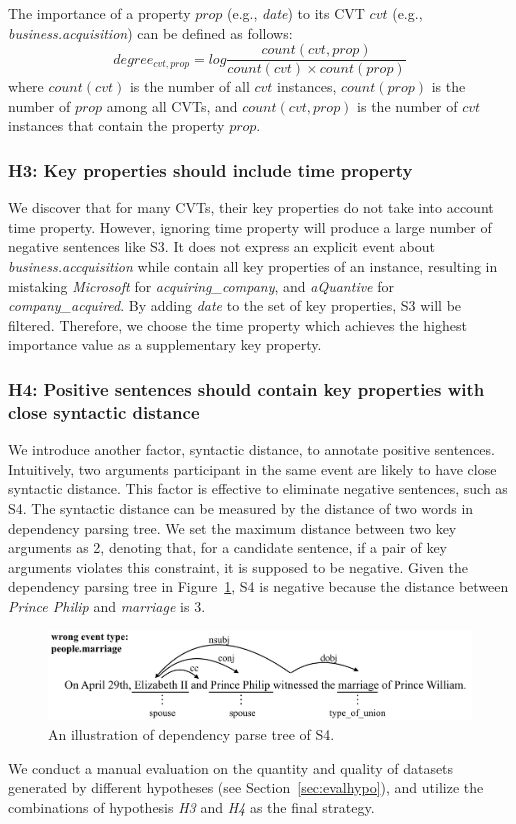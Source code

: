 The importance of a property $prop$ (e.g., \emph{date}) to its CVT $cvt$ (e.g., \emph{business.acquisition}) can be defined as follows:
\begin{equation}
	degree_{cvt, prop} = log \frac{count(cvt, prop)}{count(cvt) \times count(prop)} 
\end{equation}
where $count(cvt)$ is the number of all $cvt$ instances, $count(prop)$ is the number of $prop$ among all CVTs, and $count(cvt, prop)$ is the number of $cvt$ instances that contain the property $prop$.

\subsubsection{H3: Key properties should include time property}
We discover that for many CVTs, their key properties do not take into account time property. However, ignoring time property will produce a large number of negative sentences like S3. It does not express an explicit event about \emph{business.accquisition} while contain all key properties of an instance, resulting in mistaking \emph{Microsoft} for \emph{acquiring\_company}, and \emph{aQuantive} for \emph{company\_acquired}. By adding \emph{date} to the set of key properties, S3 will be filtered. Therefore, we choose the time property which achieves the highest importance value as a supplementary key property. 

\subsubsection{H4: Positive sentences should contain key properties with close syntactic distance}
We introduce another factor, syntactic distance, to annotate positive sentences. Intuitively, two arguments participant in the same event are likely to have close syntactic distance. This factor is effective to eliminate negative sentences, such as S4. The syntactic distance can be measured by the distance of two words in dependency parsing tree. We set the maximum distance between two key arguments as 2, denoting that, for a candidate sentence, if a pair of key arguments violates this constraint, it is supposed to be negative. Given the dependency parsing tree in Figure~\ref{fig:2}, S4 is negative because the distance between \emph{Prince Philip} and \emph{marriage} is 3.

\begin{figure}
	\includegraphics[width=.48\textwidth]{deppath}
	\caption{An illustration of dependency parse tree of S4. \label{fig:2}}
\end{figure}

We conduct a manual evaluation on the quantity and quality of  datasets generated by different hypotheses (see Section~\ref{sec:evalhypo}), and utilize the combinations of hypothesis \emph{H3} and \emph{H4} as the final strategy.